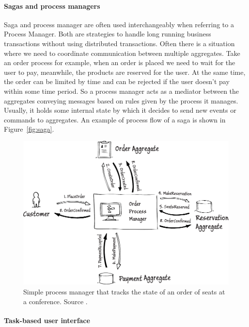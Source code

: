 \documentclass{book}
\begin{document}
\paragraph{Sagas and process managers}\label{sagas-and-process-managers}

Saga and process manager are often used interchangeably when referring
to a Process Manager. Both are strategies to handle long running
business transactions without using distributed transactions. Often
there is a situation where we need to coordinate communication between
multiple aggregates. Take an order process for example, when an order is
placed we need to wait for the user to pay, meanwhile, the products are
reserved for the user. At the same time, the order can be limited by
time and can be rejected if the user doesn't pay within some time
period. So a process manager acts as a mediator between the aggregates
conveying messages based on rules given by the process it manages.
Usually, it holds some internal state by which it decides to send new
events or commands to aggregates. An example of process flow of a saga
is shown in Figure~\ref{fig:saga}.


\begin{figure}[h!]
\begin{center}
\includegraphics[width=0.7\columnwidth]{figures/saga/saga}
\caption{Simple process manager that tracks the state of an order of seats at a
conference. Source \cite{journey}.%
}
\end{center}
\end{figure}

\paragraph{Task-based user interface}\label{task-based-user-interface}
\end{document}
